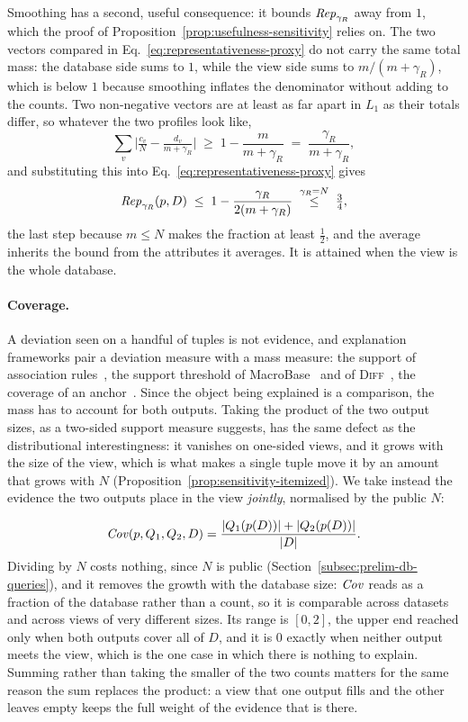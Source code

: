 Smoothing has a second, useful consequence: it bounds $\mathit{Rep}_{\gamma_R}$ away from $1$, which the proof of Proposition~\ref{prop:usefulness-sensitivity} relies on.
The two vectors compared in Eq.~\eqref{eq:representativeness-proxy} do not carry the same total mass: the database side sums to $1$, while the view side sums to $m/(m+\gamma_R)$, which is below $1$ because smoothing inflates the denominator without adding to the counts.
Two non-negative vectors are at least as far apart in $L_1$ as their totals differ, so whatever the two profiles look like,
\[
\sum_v\Big|\tfrac{c_v}{N}-\tfrac{d_v}{m+\gamma_R}\Big|\;\ge\;1-\frac{m}{m+\gamma_R}\;=\;\frac{\gamma_R}{m+\gamma_R},
\]
and substituting this into Eq.~\eqref{eq:representativeness-proxy} gives
\begin{equation}
\mathit{Rep}_{\gamma_R}(p,D)\;\le\;1-\frac{\gamma_R}{2(m+\gamma_R)}\;\overset{\gamma_R=N}{\le}\;\tfrac{3}{4},
\label{eq:rep-upper}
\end{equation}
the last step because $m\le N$ makes the fraction at least $\tfrac12$, and the average inherits the bound from the attributes it averages.
It is attained when the view is the whole database.

\paragraph{Coverage.}
A deviation seen on a handful of tuples is not evidence, and explanation frameworks pair a deviation measure with a mass measure: the support of association rules~\cite{AgrawalIS93}, the support threshold of MacroBase~\cite{MacroBase} and of \textsc{Diff}~\cite{DIFF}, the coverage of an anchor~\cite{Anchors}.
Since the object being explained is a comparison, the mass has to account for both outputs.
Taking the product of the two output sizes, as a two-sided support measure suggests, has the same defect as the distributional interestingness: it vanishes on one-sided views, and it grows with the size of the view, which is what makes a single tuple move it by an amount that grows with $N$ (Proposition~\ref{prop:sensitivity-itemized}).
We take instead the evidence the two outputs place in the view \emph{jointly}, normalised by the public $N$:

\begin{equation}
\mathit{Cov}(p,Q_1,Q_2,D)=\frac{|Q_1(p(D))|+|Q_2(p(D))|}{|D|}.
\label{eq:coverage-proxy}
\end{equation}
Dividing by $N$ costs nothing, since $N$ is public (Section~\ref{subsec:prelim-db-queries}), and it removes the growth with the database size: $\mathit{Cov}$ reads as a fraction of the database rather than a count, so it is comparable across datasets and across views of very different sizes.
Its range is $[0,2]$, the upper end reached only when both outputs cover all of $D$, and it is $0$ exactly when neither output meets the view, which is the one case in which there is nothing to explain.
Summing rather than taking the smaller of the two counts matters for the same reason the sum replaces the product: a view that one output fills and the other leaves empty keeps the full weight of the evidence that is there.

